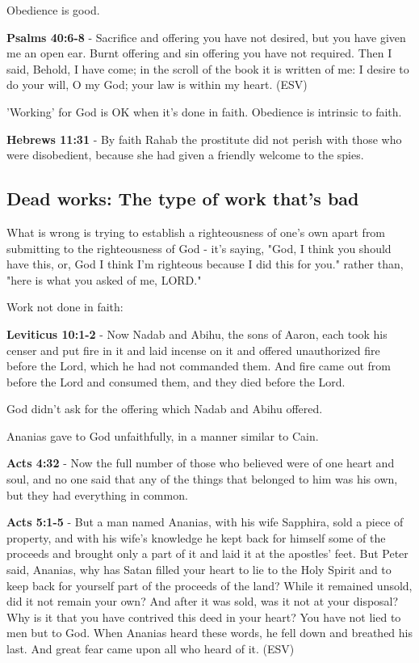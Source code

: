 \documentclass[11pt]{article}
\begin{document}
Obedience is good.

\textbf{Psalms 40:6-8} - Sacrifice and offering you have not desired, but you have given me an open ear. Burnt offering and sin offering you have not required. Then I said, Behold, I have come; in the scroll of the book it is written of me: I desire to do your will, O my God; your law is within my heart. (ESV)

'Working' for God is OK when it's done in faith.
Obedience is intrinsic to faith.

\textbf{Hebrews 11:31} - By faith Rahab the prostitute did not perish with those who were disobedient, because she had given a friendly welcome to the spies.

\subsection{Dead works: The type of work that's bad}
\label{sec:org0a69e7a}
What is wrong is trying to establish a righteousness of one's own apart from submitting to the righteousness of God - it's saying, "God, I think you should have this, or, God I think I'm righteous because I did this for you." rather than, "here is what you asked of me, LORD."

Work not done in faith:

\textbf{Leviticus 10:1-2} - Now Nadab and Abihu, the sons of Aaron, each took his censer and put fire in it and laid incense on it and offered unauthorized fire before the Lord, which he had not commanded them. And fire came out from before the Lord and consumed them, and they died before the Lord.

God didn't ask for the offering which Nadab and Abihu offered.

Ananias gave to God unfaithfully, in a manner similar to Cain.

\textbf{Acts 4:32} - Now the full number of those who believed were of one heart and soul, and no one said that any of the things that belonged to him was his own, but they had everything in common.

\textbf{Acts 5:1-5} -  But a man named Ananias, with his wife Sapphira, sold a piece of property, and with his wife's knowledge he kept back for himself some of the proceeds and brought only a part of it and laid it at the apostles' feet.  But Peter said, Ananias, why has Satan filled your heart to lie to the Holy Spirit and to keep back for yourself part of the proceeds of the land?  While it remained unsold, did it not remain your own?  And after it was sold, was it not at your disposal?  Why is it that you have contrived this deed in your heart?  You have not lied to men but to God.  When Ananias heard these words, he fell down and breathed his last.  And great fear came upon all who heard of it.  (ESV)
\end{document}
